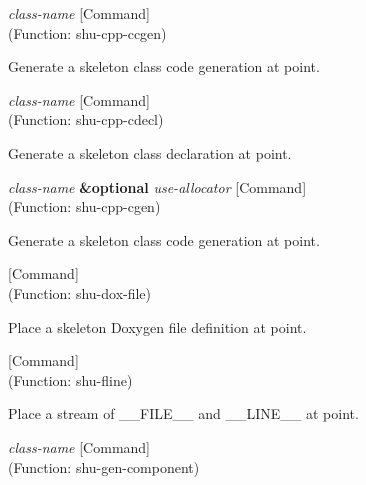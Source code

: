 \vspace{1em}
\noindent
{}
\usebox{\funcname}\emph{class-name}
 \hfill [Command]\\%
 (Function: shu-cpp-ccgen)

\begin{doc-string}
Generate a skeleton class code generation at point.
\end{doc-string}

\vspace{1em}
\noindent
{}
\usebox{\funcname}\emph{class-name}
 \hfill [Command]\\%
 (Function: shu-cpp-cdecl)

\begin{doc-string}
Generate a skeleton class declaration at point.
\end{doc-string}

\vspace{1em}
\noindent
{}
\usebox{\funcname}\emph{class-name} \textbf{\&optional} \emph{use-allocator}
 \hfill [Command]\\%
 (Function: shu-cpp-cgen)

\begin{doc-string}
Generate a skeleton class code generation at point.
\end{doc-string}

\vspace{1em}
\noindent
{}
\usebox{\funcname}
 \hfill [Command]\\%
 (Function: shu-dox-file)

\begin{doc-string}
Place a skeleton Doxygen file definition at point.
\end{doc-string}

\vspace{1em}
\noindent
{}
\usebox{\funcname}
 \hfill [Command]\\%
 (Function: shu-fline)

\begin{doc-string}
Place a stream of \_\_FILE\_\_ and \_\_LINE\_\_ at point.
\end{doc-string}

\vspace{1em}
\noindent
{}
\usebox{\funcname}\emph{class-name}
 \hfill [Command]\\%
 (Function: shu-gen-component)

